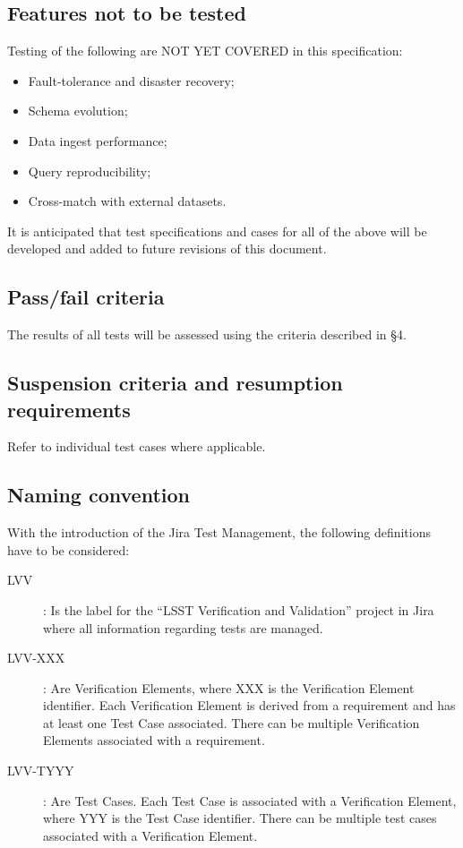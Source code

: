 \documentclass[DM,STS,toc]{lsstdoc}
\begin{document}
\subsection{Features not to be tested}
\label{sec:featnot2test}

Testing of the following are NOT YET COVERED in this specification:

\begin{itemize}
  \item{Fault-tolerance and disaster recovery;}
  \item{Schema evolution;}
  \item{Data ingest performance;}
  \item{Query reproducibility;}
  \item{Cross-match with external datasets.}
\end{itemize}

It is anticipated that test specifications and cases for all of the above will be developed
and added to future revisions of this document.

\subsection{Pass/fail criteria}
\label{sec:passfail}

The results of all tests will be assessed using the criteria described in  \S4.

\subsection{Suspension criteria and resumption requirements}
\label{suspension}

Refer to individual test cases where applicable.

\subsection{Naming convention}

With the introduction of the Jira Test Management, the following definitions have to be considered:

\begin{description}
  \item[LVV]{: Is the label for the ``LSST Verification and Validation'' project in Jira where all information regarding tests are managed.}
  \item[LVV-XXX]{: Are Verification Elements, where XXX is the Verification Element identifier.  Each Verification Element is derived from a requirement and has at least one Test Case associated. There can be multiple Verification Elements associated with a requirement.}
  \item[LVV-TYYY]{: Are Test Cases. Each Test Case is associated with a Verification Element, where YYY is the Test Case identifier. There can be multiple test cases associated with a Verification Element.}
\end{description}
\end{document}
